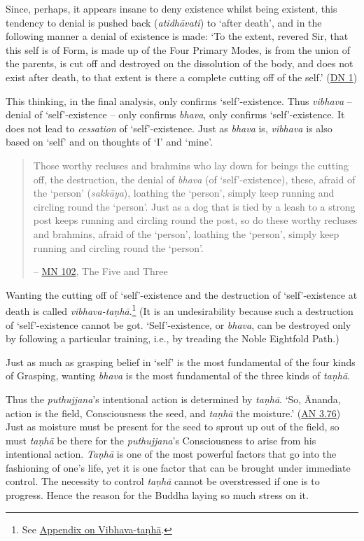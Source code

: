 Since, perhaps, it appears insane to deny existence whilst being existent, this tendency to denial is pushed back (\textit{atidhāvati}) to `after death', and in the following manner a denial of existence is made: `To the extent, revered Sir, that this self is of Form, is made up of the Four Primary Modes, is from the union of the parents, is cut off and destroyed on the dissolution of the body, and does not exist after death, to that extent is there a complete cutting off of the self.' (\href{https://suttacentral.net/dn1/en/bodhi}{DN 1})

This thinking, in the final analysis, only confirms `self'-existence. Thus \textit{vibhava} -- denial of `self'-existence -- only confirms \textit{bhava}, only confirms `self'-existence. It does not lead to \emph{cessation} of `self'-existence. Just as \textit{bhava} is, \textit{vibhava} is also based on `self' and on thoughts of `I' and `mine'.

\begin{quote}
Those worthy recluses and brahmins who lay down for beings the cutting off, the destruction, the denial of \textit{bhava} (of `self'-existence), these, afraid of the `person' (\textit{sakkāya}), loathing the `person', simply keep running and circling round the `person'. Just as a dog that is tied by a leash to a strong post keeps running and circling round the post, so do these worthy recluses and brahmins, afraid of the `person', loathing the `person', simply keep running and circling round the `person'.

 -- \href{https://suttacentral.net/mn102/en/sujato}{MN 102}, The Five and Three
\end{quote}

Wanting the cutting off of `self'-existence and the destruction of `self'-existence at death is called \textit{vibhava-taṇhā}.\footnote{See \href{ch-99-appendix.xml\#vibhava-tanha}{Appendix on Vibhava-taṇhā}.} (It is an undesirability because such a destruction of `self'-existence cannot be got. `Self'-existence, or \textit{bhava}, can be destroyed only by following a particular training, i.e., by treading the Noble Eightfold Path.)

Just as much as grasping belief in `self' is the most fundamental of the four kinds of Grasping, wanting \textit{bhava} is the most fundamental of the three kinds of \textit{taṇhā}.

Thus the \textit{puthujjana}'s intentional action is determined by \textit{taṇhā}. `So, Ānanda, action is the field, Consciousness the seed, and \textit{taṇhā} the moisture.' (\href{https://suttacentral.net/an3.76/en/thanissaro}{AN 3.76}) Just as moisture must be present for the seed to sprout up out of the field, so must \textit{taṇhā} be there for the \textit{puthujjana}'s Consciousness to arise from his intentional action. \textit{Taṇhā} is one of the most powerful factors that go into the fashioning of one's life, yet it is one factor that can be brought under immediate control. The necessity to control \textit{taṇhā} cannot be overstressed if one is to progress. Hence the reason for the Buddha laying so much stress on it.

